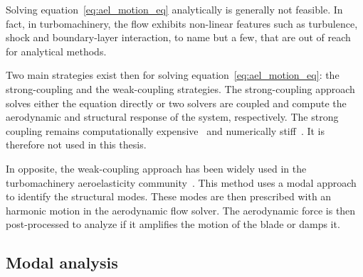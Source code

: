 
Solving equation~\ref{eq:ael_motion_eq} analytically is generally 
not feasible. In fact, in turbomachinery, 
the flow exhibits non-linear features such as turbulence, shock and
boundary-layer interaction, to name but a few, that are out of reach for
analytical methods.

Two main strategies exist then for solving equation~\ref{eq:ael_motion_eq}:
the strong-coupling and the weak-coupling strategies. The strong-coupling 
approach solves either the equation directly or two solvers are coupled and 
compute the aerodynamic and structural response of the system, respectively.
The strong coupling remains computationally expensive~\cite{Bartels2007}
and numerically stiff~\cite{Datta2008}.
It is therefore not used in this thesis.

In opposite, the weak-coupling approach has been widely used
in the turbomachinery aeroelasticity community~\cite{Marshall1996}.
This method uses a modal approach to identify the structural modes.
These modes are then prescribed with an harmonic motion in the aerodynamic
flow solver. The aerodynamic force is then post-processed to 
analyze if it amplifies the motion of the blade or damps it.

\subsection{Modal analysis}
\label{sub:modal_analysis}


